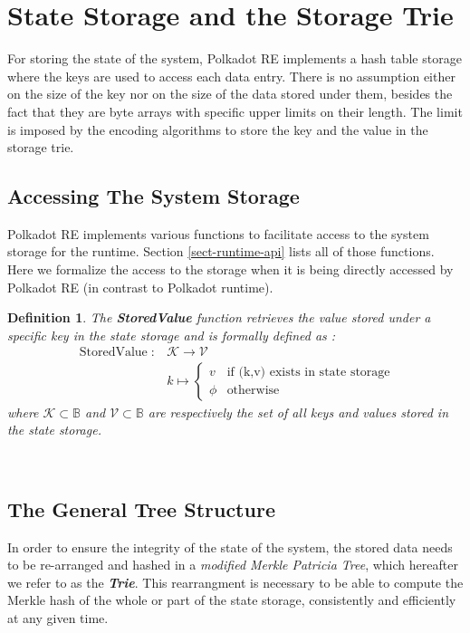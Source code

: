 \documentclass{article}
\newcommand{\tmem}[1]{{\em #1\/}}
\newcommand{\tmop}[1]{\ensuremath{\operatorname{#1}}}
\newcommand{\tmstrong}[1]{\textbf{#1}}
\newcommand{\tmtextbf}[1]{{\bfseries{#1}}}
\newcommand{\tmtextit}[1]{{\itshape{#1}}}
\newtheorem{definition}{Definition}
\providecommand{\tmem}[1]{\tmtextit{#1}}
\providecommand{\tmop}[1]{\ensuremath{\mathrm{#1}}}
\providecommand{\tmstrong}[1]{\tmtextbf{#1}}
\providecommand{\tmtextbf}[1]{\tmtextbf{#1}}
\providecommand{\tmtextit}[1]{\tmtextit{#1}}
\newtheorem{definition}{Definition}
\begin{document}
\section{State Storage and the Storage Trie}

For storing the state of the system, Polkadot RE implements a hash table
storage where the keys are used to access each data entry. There is no
assumption either on the size of the key nor on the size of the data stored
under them, besides the fact that they are byte arrays with specific upper
limits on their length. The limit is imposed by the encoding algorithms to
store the key and the value in the storage trie.

\subsection{Accessing The System Storage }

Polkadot RE implements various functions to facilitate access to the system
storage for the runtime. Section \ref{sect-runtime-api} lists all of those
functions. Here we formalize the access to the storage when it is being
directly accessed by Polkadot RE (in contrast to Polkadot runtime).

\begin{definition}
  \label{defn-stored-value}The {\tmstrong{StoredValue}} function retrieves the
  value stored under a specific key in the state storage and is formally
  defined as :
  \[ \begin{array}{cc}
       \tmop{StoredValue} : & \mathcal{K} \rightarrow \mathcal{V}\\
       & k \mapsto \left\{ \begin{array}{cc}
         v & \text{if (k,v) exists in state storage}\\
         \phi & \tmop{otherwise}
       \end{array} \right.
     \end{array} \]
  where $\mathcal{K} \subset \mathbb{B}$ and $\mathcal{V} \subset \mathbb{B}$
  are respectively the set of all keys and values stored in the state storage.
  
  \ 
\end{definition}

\subsection{The General Tree Structure}

In order to ensure the integrity of the state of the system, the stored data
needs to be re-arranged and hashed in a {\tmem{modified Merkle Patricia
Tree}}, which hereafter we refer to as the {\tmem{{\tmstrong{Trie}}}}. This
rearrangment is necessary to be able to compute the Merkle hash of the whole
or part of the state storage, consistently and efficiently at any given time.
\end{document}
